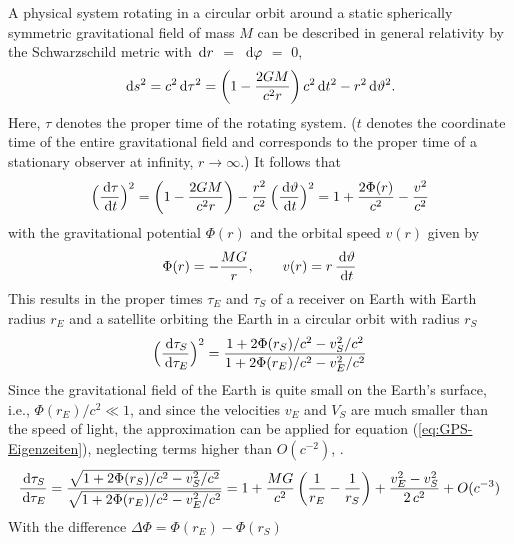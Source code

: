 A physical system rotating in a circular orbit around a static spherically symmetric 
gravitational field of mass $M$ can be described in general relativity by
the Schwarzschild metric \cite{de-Vries-1994,de-Vries-1996} 
with $\,\mathrm{d} r$ $=$ $\,\mathrm{d} \varphi$ $=$ $0$,
\begin{equation}
	\,\mathrm{d} s^2
	= c^2 \,\mathrm{d} \tau^2
	= \left(1 - \frac{2GM}{c^2 r}\right) c^2 \,\mathrm{d} t^2 - r^2 \,\mathrm{d} \vartheta^2
	.
\end{equation}
Here, $\tau$ denotes the proper time of the rotating system.
($t$ denotes the coordinate time of the entire gravitational field
and corresponds to the proper time of a stationary observer at infinity,
$r \to \infty$.)
It follows that
\begin{equation}
	\Big(\frac{\,\mathrm{d} \tau}{\,\mathrm{d} t}\Big)^2
	= \left(1 - \frac{2GM}{c^2 r}\right) 
	- \frac{r^2}{c^2} \, \Big(\frac{\,\mathrm{d} \vartheta}{\,\mathrm{d} t}\Big)^2
	= 1 + \frac{2 \Phi(r)}{c^2} - \frac{v^2}{c^2}
\end{equation}
with the gravitational potential $\Phi(r)$ 
\cite[VI.2]{Straumann-1988} %
and the orbital speed
$v(r)$ given by
\begin{equation}
	\Phi(r)
	= - \frac{M G}{r}
	, \qquad
	v(r) = r \, \frac{\,\mathrm{d} \vartheta}{\,\mathrm{d} t}
\end{equation}
This results in the proper times $\tau_E$ and $\tau_S$ of a receiver
on Earth with Earth radius $r_E$ and a satellite orbiting the Earth in a circular orbit
with radius $r_S$
\cite{Pascual-Sanchez-2007}
\begin{equation}
	\Big(\frac{\,\mathrm{d} \tau_S}{\,\mathrm{d} \tau_E} \Big)^2
	= \frac{1 + 2\Phi(r_S)/c^2 - v_S^2/c^2}
		{1 + 2\Phi(r_E)/c^2 - v_E^2 / c^2}
	\label{eq:GPS-Eigenzeiten}
\end{equation}
Since the gravitational field of the Earth is quite small on the Earth's surface,
 i.e., $\Phi(r_E)/c^2 \ll 1$, and since the velocities
$v_E$ and $V_S$ are much smaller than the speed of light,
the approximation
can be applied for equation (\ref{eq:GPS-Eigenzeiten}),
neglecting terms higher than $O(c^{-2})$, \cite{Pascual-Sanchez-2007,Singer-1956}.
\begin{equation}
	\frac{\D \tau_S}{\D \tau_E}
	= \frac{\sqrt{1 + 2\Phi(r_S)/c^2 - v_S^2/c^2}}
		{\sqrt{1 + 2\Phi(r_E)/c^2 - v_E^2 / c^2}}
	= %
	1 + \frac{MG}{c^2} \left(\frac{1}{r_E} - \frac{1}{r_S}\right)
	+ \frac{v_E^2 - v_S^2}{2\, c^2}
	+ O(c^{-3})
	\label{eq:GPS-Zeitdilatation-approx}
\end{equation}
With the difference $\Delta \Phi = \Phi(r_E) - \Phi(r_S)$
